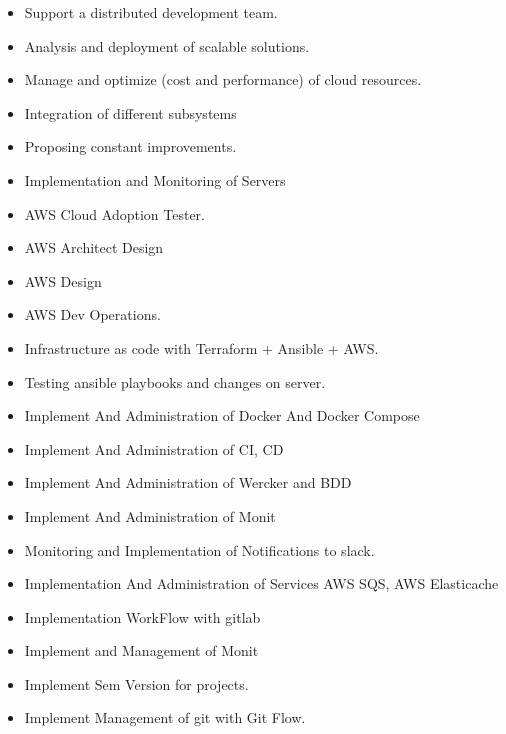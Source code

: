 \documentclass[10pt,a4paper]{altacv}
\begin{document}
\begin{itemize}
    \item Support a distributed development team.
    \item Analysis and deployment of scalable solutions.
    \item Manage and optimize (cost and performance) of cloud resources.
    \item Integration of different subsystems
    \item Proposing constant improvements.
    \item Implementation and Monitoring of Servers
    \item AWS Cloud Adoption Tester.
    \item AWS Architect Design
    \item AWS Design
    \item AWS Dev Operations.
    \item Infrastructure as code with Terraform + Ansible + AWS.
    \item Testing ansible playbooks and changes on server.
    \item Implement And Administration of Docker And Docker Compose
    \item Implement And Administration of CI, CD
    \item Implement And Administration of Wercker and BDD
    \item Implement And Administration of Monit
    \item Monitoring and Implementation of Notifications to slack.
    \item Implementation And Administration of Services AWS SQS, AWS Elasticache
    \item Implementation WorkFlow with gitlab
    \item Implement and Management of Monit
    \item Implement Sem Version for projects.
    \item Implement Management of git with Git Flow.
\end{itemize}

\divider
\end{document}
